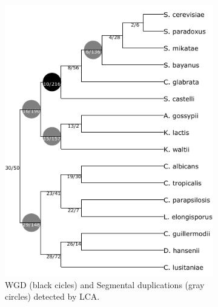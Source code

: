 \documentclass[10pt]{article}
\begin{document}
\begin{figure}[h!]
    \centering

    \begin{subfigure}[b]{0.48\textwidth}
        \centering
        \includegraphics[scale=0.7]{figs/fungi_lca.pdf} %
        \caption{WGD (black cicles) and Segmental duplications (gray circles) detected by LCA.}
        \label{fig:fungi-lca}
    \end{subfigure}
    \hfill
    \begin{subfigure}[b]{0.48\textwidth}
        \centering

\end{subfigure}
\end{figure}
\end{document}
